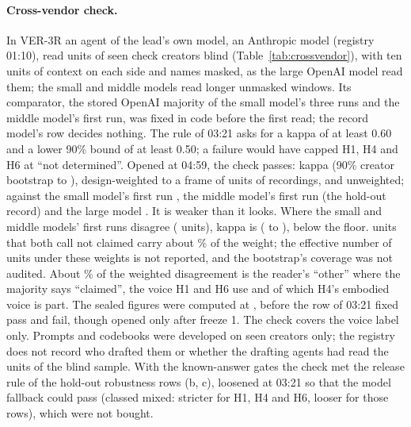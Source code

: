 \paragraph{Cross-vendor check.} In VER-3R an agent of the lead's own model, an Anthropic model (registry 01:10), read
\VtrUnits{} units of \VtrCreators{} seen check creators blind (Table~\ref{tab:crossvendor}), with ten units of context
on each side and names masked, as the large OpenAI model read them; the small and middle models read longer unmasked
windows. Its comparator, the stored OpenAI majority of the small model's three runs and the middle model's first run,
was fixed in code before the first read; the record model's row decides nothing. The rule of 03:21 asks for a kappa of
at least 0.60 and a lower 90\% bound of at least 0.50; a failure would have capped H1, H4 and H6 at ``not determined''.
Opened at 04:59, the check passes: kappa \VtrKappa{} (90\% creator bootstrap \VtrKappaLo{} to \VtrKappaHi),
design-weighted to a frame of \VtrFrameUnits{} units of \VtrRecordings{} recordings, and \VtrKappaUnweighted{}
unweighted; against the small model's first run \VtrSmallRunOne, the middle model's first run (the hold-out record)
\VtrMiddleRunOne{} and the large model \VtrLarge. It is weaker than it looks. Where the small and middle models' first
runs disagree (\VtrDisagreeUnits{} units), kappa is \VtrDisagreeKappa{} (\VtrDisagreeKappaLo{} to
\VtrDisagreeKappaHi), below the floor. \VtrHeavyUnits{} units that both call not claimed carry about
\VtrHeavySharePct\% of the weight; the effective number of units under these weights is not reported, and the
bootstrap's coverage was not audited. About \VtrOtherClaimedSharePct\% of the weighted disagreement is the reader's
``other'' where the majority says ``claimed'', the voice H1 and H6 use and of which H4's embodied voice is part. The
sealed figures were computed at \VtrSealMadeStamp, before the row of 03:21 fixed pass and fail, though opened only after
freeze 1. The check covers the voice label only. Prompts and codebooks were developed on seen creators only; the
registry does not record who drafted them or whether the drafting agents had read the units of the blind sample. With
the known-answer gates the check met the release rule of the hold-out robustness rows (b, c), loosened at 03:21 so that
the model fallback could pass (classed mixed: stricter for H1, H4 and H6, looser for those rows), which were not
bought.

